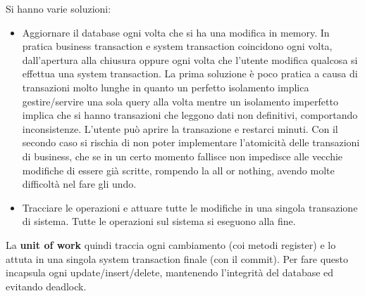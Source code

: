 Si hanno varie soluzioni:
\begin{itemize}
    \item Aggiornare il database ogni volta che si ha una modifica in memory.
          In pratica business transaction e system transaction coincidono ogni volta,
          dall'apertura alla chiusura oppure ogni volta che l'utente modifica qualcosa
          si effettua una system transaction. La prima soluzione è poco pratica a causa
          di transazioni molto lunghe in quanto un perfetto isolamento implica gestire/servire
          una sola query alla volta mentre un isolamento imperfetto implica che si hanno transazioni
          che leggono dati non definitivi, comportando inconsistenze. L'utente può aprire la
          transazione e restarci minuti. Con il secondo caso si rischia di non poter implementare
          l'atomicità delle transazioni di business, che se in un certo momento fallisce non impedisce
          alle vecchie modifiche di essere già scritte, rompendo la all or nothing, avendo molte
          difficoltà nel fare gli undo.
    \item Tracciare le operazioni e attuare tutte le modifiche in una singola
          transazione di sistema. Tutte le operazioni sul sistema si eseguono alla fine.
\end{itemize}
La \textbf{unit of work} quindi traccia ogni cambiamento (coi metodi register) e
lo attuta in una singola system transaction finale (con il commit). Per fare questo incapsula ogni update/insert/delete, mantenendo l'integrità del database ed evitando deadlock.

